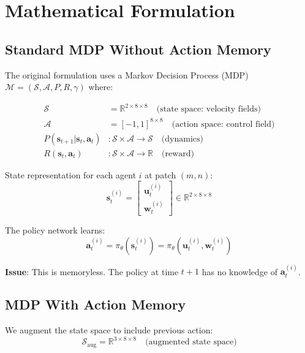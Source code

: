 \documentclass[11pt,a4paper]{article}
\newcommand{\R}{\mathbb{R}}
\theoremstyle{definition}
\begin{document}
\section{Mathematical Formulation}

\subsection{Standard MDP Without Action Memory}

The original formulation uses a Markov Decision Process (MDP) $\mathcal{M} = (\mathcal{S}, \mathcal{A}, P, R, \gamma)$ where:

\begin{align}
    \mathcal{S} &= \R^{2 \times 8 \times 8} \quad \text{(state space: velocity fields)} \\
    \mathcal{A} &= [-1, 1]^{8 \times 8} \quad \text{(action space: control field)} \\
    P(\mathbf{s}_{t+1} | \mathbf{s}_t, \mathbf{a}_t) &: \mathcal{S} \times \mathcal{A} \to \mathcal{S} \quad \text{(dynamics)} \\
    R(\mathbf{s}_t, \mathbf{a}_t) &: \mathcal{S} \times \mathcal{A} \to \R \quad \text{(reward)}
\end{align}

State representation for each agent $i$ at patch $(m,n)$:
\begin{equation}
    \mathbf{s}_t^{(i)} = \begin{bmatrix}
        \mathbf{u}_t^{(i)} \\
        \mathbf{w}_t^{(i)}
    \end{bmatrix} \in \R^{2 \times 8 \times 8}
\end{equation}

The policy network learns:
\begin{equation}
    \mathbf{a}_t^{(i)} = \pi_\theta(\mathbf{s}_t^{(i)}) = \pi_\theta(\mathbf{u}_t^{(i)}, \mathbf{w}_t^{(i)})
\end{equation}

\textbf{Issue}: This is memoryless. The policy at time $t+1$ has no knowledge of $\mathbf{a}_t^{(i)}$.

\subsection{MDP With Action Memory}

We augment the state space to include previous action:
\begin{equation}
    \mathcal{S}_{\text{aug}} = \R^{3 \times 8 \times 8} \quad \text{(augmented state space)}
\end{equation}
\end{document}
